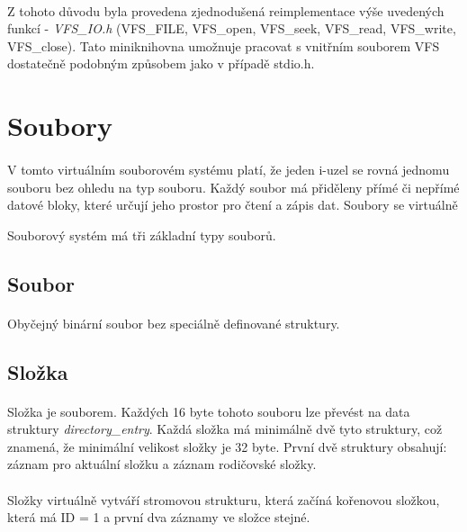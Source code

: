\documentclass[12pt, a4paper]{article}
\begin{document}
\paragraph{}
Z tohoto důvodu byla provedena zjednodušená reimplementace výše uvedených funkcí - \textit{VFS\_IO.h} (VFS\_FILE, VFS\_open, VFS\_seek, VFS\_read, VFS\_write, VFS\_close). Tato miniknihovna umožnuje pracovat s vnitřním souborem VFS dostatečně podobným způsobem jako v případě stdio.h. 

\newpage
\section{Soubory}
\paragraph{}
V tomto virtuálním souborovém systému platí, že jeden i-uzel se rovná jednomu souboru bez ohledu na typ souboru. Každý soubor má přiděleny přímé či nepřímé datové bloky, které určují jeho prostor pro čtení a zápis dat. Soubory se virtuálně 

Souborový systém má tři základní typy souborů. 

\subsection{Soubor} 
\paragraph{}
Obyčejný binární soubor bez speciálně definované struktury. 

\subsection{Složka}
\paragraph{}
Složka je souborem. Každých 16 byte tohoto souboru lze převést na data struktury \textit{directory\_entry}. Každá složka má minimálně dvě tyto struktury, což znamená, že minimální velikost složky je 32 byte. První dvě struktury obsahují: záznam pro aktuální složku a záznam rodičovské složky. 
\paragraph{}
Složky virtuálně vytváří stromovou strukturu, která začíná kořenovou složkou, která má ID = 1 a první dva záznamy ve složce stejné. 
\end{document}
